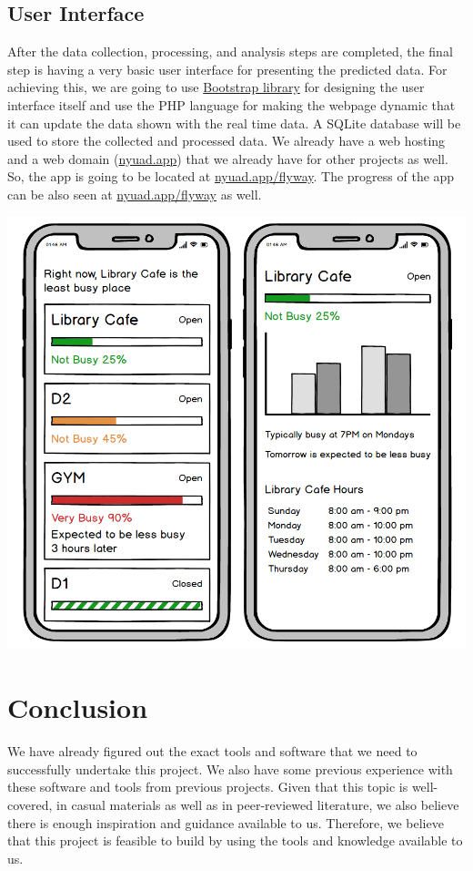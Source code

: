 \documentclass[journal, 12pt]{IEEEtran}
\begin{document}
\subsection{User Interface} 
\noindent After the data collection, processing, and analysis steps are completed, the final step is having a very basic user interface for presenting the predicted data. For achieving this, we are going to use \href{https://getbootstrap.com/}{Bootstrap library} for designing the user interface itself and use the PHP language for making the webpage dynamic that it can update the data shown with the real time data. A SQLite database will be used to store the collected and processed data. We already have a web hosting and a web domain (\href{https://nyuad.app/}{nyuad.app}) that we already have for other projects as well. So, the app is going to be located at \href{https://nyuad.app/flyway/}{nyuad.app/flyway}. The progress of the app can be also seen at \href{https://nyuad.app/flyway/}{nyuad.app/flyway} as well.

\begingroup
    \center
    \medskip
    \includegraphics[width=0.8\columnwidth]{report/interim_report/images/ux.png}
    \label{fig:ux}
    \medskip
\endgroup

\section{Conclusion} 
\noindent We have already figured out the exact tools and software that we need to successfully undertake this project. We also have some previous experience with these software and tools from previous projects. Given that this topic is well-covered, in casual materials as well as in peer-reviewed literature, we also believe there is enough inspiration and guidance available to us. Therefore, we believe that this project is feasible to build by using the tools and knowledge available to us.




\printbibliography
\end{document}
